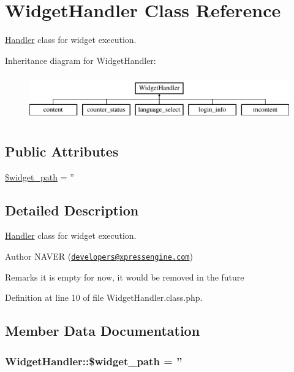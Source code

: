 \hypertarget{classWidgetHandler}{\section{Widget\+Handler Class Reference}
\label{classWidgetHandler}
}


\hyperlink{classHandler}{Handler} class for widget execution.  


Inheritance diagram for Widget\+Handler\+:\begin{figure}[H]
\begin{center}
\leavevmode
\includegraphics[height=2.000000cm]{classWidgetHandler}
\end{center}
\end{figure}
\subsection*{Public Attributes}
\begin{DoxyCompactItemize}
\item 
\hyperlink{classWidgetHandler_a153b7e8baf0e97c152eb6d4dfae17e9d}{\$widget\+\_\+path} = ''
\end{DoxyCompactItemize}


\subsection{Detailed Description}
\hyperlink{classHandler}{Handler} class for widget execution. 

\begin{DoxyAuthor}{Author}
N\+A\+V\+E\+R (\href{mailto:developers@xpressengine.com}{\tt developers@xpressengine.\+com}) 
\end{DoxyAuthor}
\begin{DoxyRemark}{Remarks}
it is empty for now, it would be removed in the future 
\end{DoxyRemark}


Definition at line 10 of file Widget\+Handler.\+class.\+php.



\subsection{Member Data Documentation}
\hypertarget{classWidgetHandler_a153b7e8baf0e97c152eb6d4dfae17e9d}{
\subsubsection[{\$widget\+\_\+path}]{\setlength{\rightskip}{0pt plus 5cm}Widget\+Handler\+::\$widget\+\_\+path = ''}}\label{classWidgetHandler_a153b7e8baf0e97c152eb6d4dfae17e9d}


